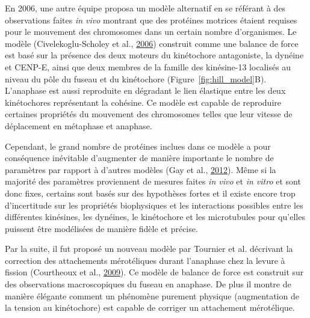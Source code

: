 \documentclass[12pt,a4paper,twoside,openright]{book}
\begin{document}
En 2006, une autre équipe proposa un modèle alternatif en se référant à
des observations faites \emph{in vivo} montrant que des protéines
motrices étaient requises pour le mouvement des chromosomes dans un
certain nombre d'organismes. Le modèle (Civelekoglu-Scholey et al.,
\hyperref[ref-Civelekoglu-Scholey2006]{2006}) construit comme une
balance de force est basé sur la présence des deux moteurs du
kinétochore antagoniste, la dynéine et CENP-E, ainsi que deux membres de
la famille des kinésine-13 localisés au niveau du pôle du fuseau et du
kinétochore (Figure~\ref{fig:hill_model}B). L'anaphase est aussi
reproduite en dégradant le lien élastique entre les deux kinétochores
représentant la cohésine. Ce modèle est capable de reproduire certaines
propriétés du mouvement des chromosomes telles que leur vitesse de
déplacement en métaphase et anaphase.

Cependant, le grand nombre de protéines inclues dans ce modèle a pour
conséquence inévitable d'augmenter de manière importante le nombre de
paramètres par rapport à d'autres modèles (Gay et al.,
\hyperref[ref-Gay2012a]{2012}). Même si la majorité des paramètres
proviennent de mesures faites \emph{in vivo} et \emph{in vitro} et sont
donc fixes, certains sont basés sur des hypothèses fortes et il existe
encore trop d'incertitude sur les propriétés biophysiques et les
interactions possibles entre les différentes kinésines, les dynéines, le
kinétochore et les microtubules pour qu'elles puissent être modélisées
de manière fidèle et précise.

Par la suite, il fut proposé un nouveau modèle par Tournier et al.
décrivant la correction des attachements mérotéliques durant l'anaphase
chez la levure à fission (Courtheoux et al.,
\hyperref[ref-Courtheoux2009]{2009}). Ce modèle de balance de force est
construit sur des observations macroscopiques du fuseau en anaphase. De
plus il montre de manière élégante comment un phénomène purement
physique (augmentation de la tension au kinétochore) est capable de
corriger un attachement mérotélique.
\end{document}
